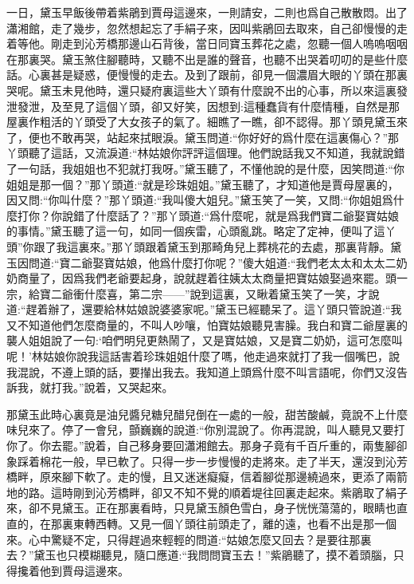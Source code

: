 \begin{parag}
    一日，黛玉早飯後帶着紫鵑到賈母這邊來，一則請安，二則也爲自己散散悶。出了瀟湘館，走了幾步，忽然想起忘了手絹子來，因叫紫鵑回去取來，自己卻慢慢的走着等他。剛走到沁芳橋那邊山石背後，當日同寶玉葬花之處，忽聽一個人嗚嗚咽咽在那裏哭。黛玉煞住腳聽時，又聽不出是誰的聲音，也聽不出哭着叨叨的是些什麼話。心裏甚是疑惑，便慢慢的走去。及到了跟前，卻見一個濃眉大眼的丫頭在那裏哭呢。黛玉未見他時，還只疑府裏這些大丫頭有什麼說不出的心事，所以來這裏發泄發泄，及至見了這個丫頭，卻又好笑，因想到:這種蠢貨有什麼情種，自然是那屋裏作粗活的丫頭受了大女孩子的氣了。細瞧了一瞧，卻不認得。那丫頭見黛玉來了，便也不敢再哭，站起來拭眼淚。黛玉問道:“你好好的爲什麼在這裏傷心？”那丫頭聽了這話，又流淚道:“林姑娘你評評這個理。他們說話我又不知道，我就說錯了一句話，我姐姐也不犯就打我呀。”黛玉聽了，不懂他說的是什麼，因笑問道:“你姐姐是那一個？”那丫頭道:“就是珍珠姐姐。”黛玉聽了，才知道他是賈母屋裏的，因又問:“你叫什麼？”那丫頭道:“我叫傻大姐兒。”黛玉笑了一笑，又問:“你姐姐爲什麼打你？你說錯了什麼話了？”那丫頭道:“爲什麼呢，就是爲我們寶二爺娶寶姑娘的事情。”黛玉聽了這一句，如同一個疾雷，心頭亂跳。略定了定神，便叫了這丫頭”你跟了我這裏來。”那丫頭跟着黛玉到那畸角兒上葬桃花的去處，那裏背靜。黛玉因問道:“寶二爺娶寶姑娘，他爲什麼打你呢？”傻大姐道:“我們老太太和太太二奶奶商量了，因爲我們老爺要起身，說就趕着往姨太太商量把寶姑娘娶過來罷。頭一宗，給寶二爺衝什麼喜，第二宗——”說到這裏，又瞅着黛玉笑了一笑，才說道:“趕着辦了，還要給林姑娘說婆婆家呢。”黛玉已經聽呆了。這丫頭只管說道:“我又不知道他們怎麼商量的，不叫人吵嚷，怕寶姑娘聽見害臊。我白和寶二爺屋裏的襲人姐姐說了一句:‘咱們明兒更熱鬧了，又是寶姑娘，又是寶二奶奶，這可怎麼叫呢！’林姑娘你說我這話害着珍珠姐姐什麼了嗎，他走過來就打了我一個嘴巴，說我混說，不遵上頭的話，要攆出我去。我知道上頭爲什麼不叫言語呢，你們又沒告訴我，就打我。”說着，又哭起來。
\end{parag}


\begin{parag}
    那黛玉此時心裏竟是油兒醬兒糖兒醋兒倒在一處的一般，甜苦酸鹹，竟說不上什麼味兒來了。停了一會兒，顫巍巍的說道:“你別混說了。你再混說，叫人聽見又要打你了。你去罷。”說着，自己移身要回瀟湘館去。那身子竟有千百斤重的，兩隻腳卻象踩着棉花一般，早已軟了。只得一步一步慢慢的走將來。走了半天，還沒到沁芳橋畔，原來腳下軟了。走的慢，且又迷迷癡癡，信着腳從那邊繞過來，更添了兩箭地的路。這時剛到沁芳橋畔，卻又不知不覺的順着堤往回裏走起來。紫鵑取了絹子來，卻不見黛玉。正在那裏看時，只見黛玉顏色雪白，身子恍恍蕩蕩的，眼睛也直直的，在那裏東轉西轉。又見一個丫頭往前頭走了，離的遠，也看不出是那一個來。心中驚疑不定，只得趕過來輕輕的問道:“姑娘怎麼又回去？是要往那裏去？”黛玉也只模糊聽見，隨口應道:“我問問寶玉去！”紫鵑聽了，摸不着頭腦，只得攙着他到賈母這邊來。
\end{parag}


